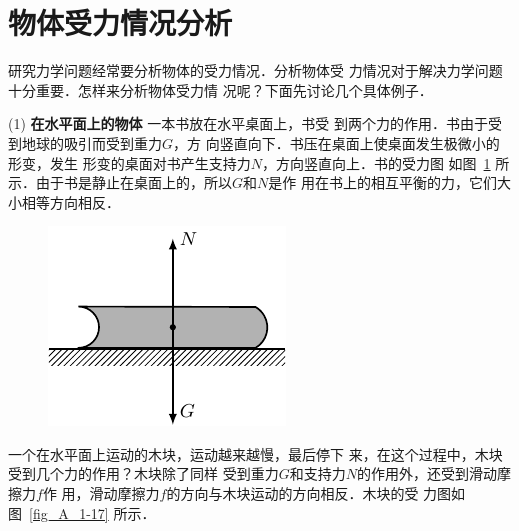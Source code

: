 \section{物体受力情况分析} 
    研究力学问题经常要分析物体的受力情况．分析物体受
力情况对于解决力学问题十分重要．怎样来分析物体受力情
况呢？下面先讨论几个具体例子．

    (1) \textbf{在水平面上的物体 }  一本书放在水平桌面上，书受
到两个力的作用．书由于受到地球的吸引而受到重力$G$，方
向竖直向下．书压在桌面上使桌面发生极微小的形变，发生
形变的桌面对书产生支持力$N$，方向竖直向上．书的受力图
如图~\ref{fig_A_1-16} 所示．由于书是静止在桌面上的，所以$G$和$N$是作
用在书上的相互平衡的力，它们大小相等方向相反．
\begin{figure} [htp]\centering
\includegraphics{fig/A/1-16.pdf} 
\caption{} \label{fig_A_1-16} 
\end{figure} 

    一个在水平面上运动的木块，运动越来越慢，最后停下
来，在这个过程中，木块受到几个力的作用？木块除了同样
受到重力$G$和支持力$N$的作用外，还受到滑动摩擦力$f$作
用，滑动摩擦力$f$的方向与木块运动的方向相反．木块的受
力图如图~\ref{fig_A_1-17} 所示．

